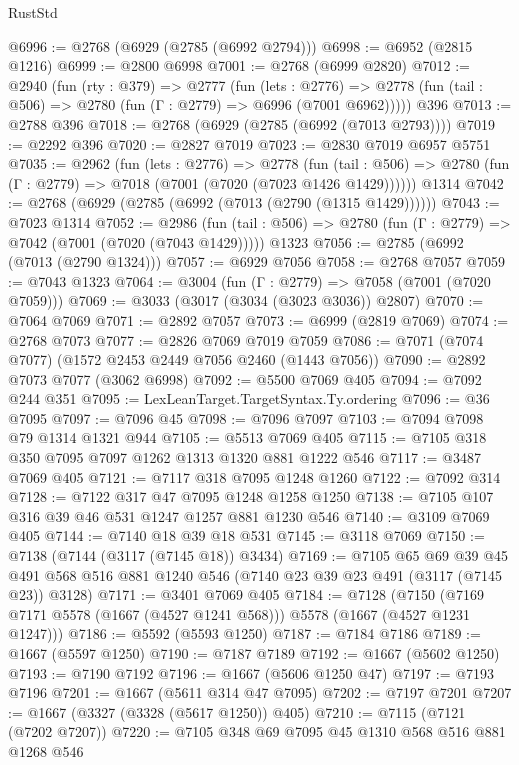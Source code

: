 \begin{lexlean}{RustStd}
\begin{coremodule}
@6996 := @2768 (@6929 (@2785 (@6992 @2794)))
@6998 := @6952 (@2815 @1216)
@6999 := @2800 @6998
@7001 := @2768 (@6999 @2820)
@7012 := @2940
    (fun (rty : @379) =>
    @2777
      (fun (lets : @2776) =>
      @2778 (fun (tail : @506) => @2780 (fun (Γ : @2779) => @6996 (@7001 @6962)))))
    @396
@7013 := @2788 @396
@7018 := @2768 (@6929 (@2785 (@6992 (@7013 @2793))))
@7019 := @2292 @396
@7020 := @2827 @7019
@7023 := @2830 @7019 @6957 @5751
@7035 := @2962
    (fun (lets : @2776) =>
    @2778
      (fun (tail : @506) => @2780 (fun (Γ : @2779) => @7018 (@7001 (@7020 (@7023 @1426 @1429))))))
    @1314
@7042 := @2768 (@6929 (@2785 (@6992 (@7013 (@2790 (@1315 @1429))))))
@7043 := @7023 @1314
@7052 := @2986
    (fun (tail : @506) => @2780 (fun (Γ : @2779) => @7042 (@7001 (@7020 (@7043 @1429)))))
    @1323
@7056 := @2785 (@6992 (@7013 (@2790 @1324)))
@7057 := @6929 @7056
@7058 := @2768 @7057
@7059 := @7043 @1323
@7064 := @3004 (fun (Γ : @2779) => @7058 (@7001 (@7020 @7059)))
@7069 := @3033 (@3017 (@3034 (@3023 @3036)) @2807)
@7070 := @7064 @7069
@7071 := @2892 @7057
@7073 := @6999 (@2819 @7069)
@7074 := @2768 @7073
@7077 := @2826 @7069 @7019 @7059
@7086 := @7071 (@7074 @7077) (@1572 @2453 @2449 @7056 @2460 (@1443 @7056))
@7090 := @2892 @7073 @7077 (@3062 @6998)
@7092 := @5500 @7069 @405
@7094 := @7092 @244 @351
@7095 := LexLeanTarget.TargetSyntax.Ty.ordering
@7096 := @36 @7095
@7097 := @7096 @45
@7098 := @7096 @7097
@7103 := @7094 @7098 @79 @1314 @1321 @944
@7105 := @5513 @7069 @405
@7115 := @7105 @318 @350 @7095 @7097 @1262 @1313 @1320 @881 @1222 @546
@7117 := @3487 @7069 @405
@7121 := @7117 @318 @7095 @1248 @1260
@7122 := @7092 @314
@7128 := @7122 @317 @47 @7095 @1248 @1258 @1250
@7138 := @7105 @107 @316 @39 @46 @531 @1247 @1257 @881 @1230 @546
@7140 := @3109 @7069 @405
@7144 := @7140 @18 @39 @18 @531
@7145 := @3118 @7069
@7150 := @7138 (@7144 (@3117 (@7145 @18)) @3434)
@7169 := @7105
    @65
    @69
    @39
    @45
    @491
    @568
    @516
    @881
    @1240
    @546
    (@7140 @23 @39 @23 @491 (@3117 (@7145 @23)) @3128)
@7171 := @3401 @7069 @405
@7184 := @7128
    (@7150 (@7169 @7171 @5578 (@1667 (@4527 @1241 @568))) @5578 (@1667 (@4527 @1231 @1247)))
@7186 := @5592 (@5593 @1250)
@7187 := @7184 @7186
@7189 := @1667 (@5597 @1250)
@7190 := @7187 @7189
@7192 := @1667 (@5602 @1250)
@7193 := @7190 @7192
@7196 := @1667 (@5606 @1250 @47)
@7197 := @7193 @7196
@7201 := @1667 (@5611 @314 @47 @7095)
@7202 := @7197 @7201
@7207 := @1667 (@3327 (@3328 (@5617 @1250)) @405)
@7210 := @7115 (@7121 (@7202 @7207))
@7220 := @7105 @348 @69 @7095 @45 @1310 @568 @516 @881 @1268 @546

\end{coremodule}
\end{lexlean}
